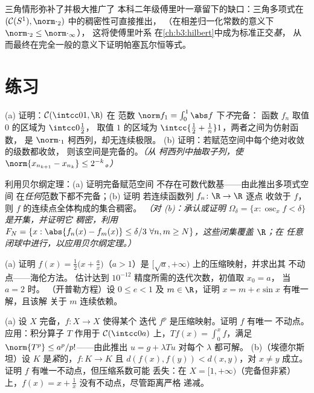 \begin{remark}\label{rem:b3:complete:swremark}
三角情形弥补了并极大推广了
本科二年级傅里叶一章留下的缺口：三角多项式在
$(\mathcal C(S^1), \norm\cdot_2)$ 中的稠密性可直接推出，
（在相差归一化常数的意义下 $\norm\cdot_2 \leq \norm\cdot_\infty$），
这将使傅里叶系
在\cref{ch:b3:hilbert}中成为标准正交\emph{基}，
从而最终在完全一般的意义下证明帕塞瓦尔恒等式。
\end{remark}

\section{练习}

\begin{exercise}[$\star$]\label{exo:b3:complete:1}
(a) 证明：$\mathcal C(\intcc01, \R)$ 在
范数 $\norm f_1 = \int_0^1\abs f$ 下\emph{不}完备：
函数 $f_n$ 取值 $0$ 的区域为 $\intcc0{\frac12}$，
取值 $1$ 的区域为 $\intcc{\frac12 + \frac1n}1$，两者之间为仿射函数，
是 $\norm\cdot_1$ 柯西列，却无连续极限。
(b) 证明：若赋范空间中每个绝对收敛的级数都收敛，
则该空间是完备的。\emph{（从
柯西列中抽取子列，使 $\norm{x_{n_{k+1}} -
x_{n_k}} \leq 2^{-k}$。）}
\end{exercise}

\begin{exercise}[$\star$]\label{exo:b3:complete:2}
利用贝尔纲定理：(a) 证明完备赋范空间
不存在可数代数基——由此推出多项式空间
在\emph{任何}范数下都不完备；(b) 证明
若连续函数列 $f_n \colon \R \to \R$ 逐点
收敛于 $f$，则 $f$ 的连续点全体构成的集合稠密。
\emph{（对 (b)：承认或证明 $\Omega_\delta = \{x :
\operatorname{osc}_x f < \delta\}$ 是开集，并证明它
稠密，利用 $F_{N} = \{x: \abs{f_n(x) - f_m(x)} \leq \delta/3\
\forall n,m \geq N\}$，这些闭集覆盖 $\R$；在
任意闭球中进行，以应用贝尔纲定理。）}
\end{exercise}

\begin{exercise}[$\star\star$]\label{exo:b3:complete:3}
(a) 证明 $f(x) = \frac12\bigl(x + \frac ax\bigr)$（$a >
1$）是 $[\sqrt a, +\infty)$ 上的压缩映射，并求出其
不动点——海伦方法。
估计达到 $10^{-12}$ 精度所需的迭代次数，初值取 $x_0 = a$，
当 $a = 2$ 时。
（开普勒方程）设 $0 \leq e < 1$ 及 $m \in \R$，证明
$x = m + e\sin x$ 有唯一解，且该解
关于 $m$ 连续依赖。
\end{exercise}

\begin{exercise}[$\star\star$]\label{exo:b3:complete:4}
(a) 设 $X$ 完备，$f \colon X \to X$ 使得某个
迭代 $f^p$ 是压缩映射。证明 $f$ 有唯一
不动点。应用：积分算子 $T$ 作用于
$\mathcal C(\intcc0a)$ 上，$Tf(x) = \int_0^x f$，满足
$\norm{T^p} \leq a^p/p!$——由此推出
$u = g + \lambda Tu$ 对每个 $\lambda$ 都可解。
(b)（埃德尔斯坦）设 $K$ 是\emph{紧}的，$f\colon K \to K$
且 $d(f(x), f(y)) < d(x, y)$，对 $x \neq y$ 成立。证明 $f$
有唯一不动点，但压缩系数可能
丢失：在 $X = [1, +\infty)$（完备但非紧）上，$f(x) = x
+ \frac1x$ 没有不动点，尽管距离严格
递减。
\end{exercise}

